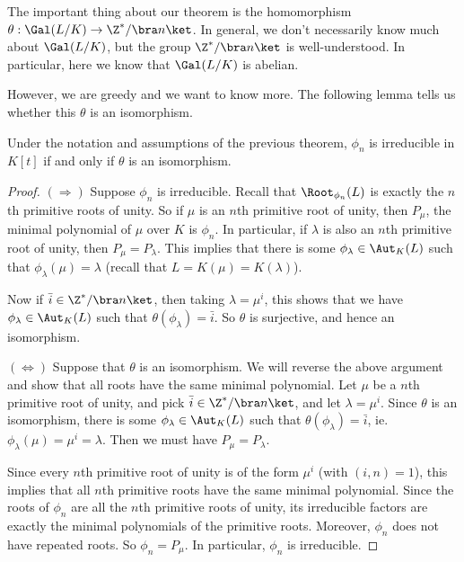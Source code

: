 \documentclass[a4paper]{article}
\begin{document}
The important thing about our theorem is the homomorphism $\theta: \Gal(L/K) \to \Z^*/\bra n\ket$. In general, we don't necessarily know much about $\Gal(L/K)$, but the group $\Z^*/\bra n\ket$ is well-understood. In particular, here we know that $\Gal(L/K)$ is abelian.

However, we are greedy and we want to know more. The following lemma tells us whether this $\theta$ is an isomorphism.

\begin{lemma}
  Under the notation and assumptions of the previous theorem, $\phi_n$ is irreducible in $K[t]$ if and only if $\theta$ is an isomorphism.
\end{lemma}

\begin{proof}
  $(\Rightarrow)$ Suppose $\phi_n$ is irreducible. Recall that $\Root_{\phi_n}(L)$ is exactly the $n$th primitive roots of unity. So if $\mu$ is an $n$th primitive root of unity, then $P_\mu$, the minimal polynomial of $\mu$ over $K$ is $\phi_n$. In particular, if $\lambda$ is also an $n$th primitive root of unity, then $P_\mu = P_\lambda$. This implies that there is some $\phi_\lambda \in \Aut_{K}(L)$ such that $\phi_\lambda(\mu) = \lambda$ (recall that $L = K(\mu) = K(\lambda)$).

  Now if $\bar{i} \in \Z^*/\bra n\ket$, then taking $\lambda = \mu^i$, this shows that we have $\phi_\lambda \in \Aut_K(L)$ such that $\theta(\phi_\lambda) = \bar{i}$. So $\theta$ is surjective, and hence an isomorphism.

  $(\Leftrightarrow)$ Suppose that $\theta$ is an isomorphism. We will reverse the above argument and show that all roots have the same minimal polynomial. Let $\mu$ be a $n$th primitive root of unity, and pick $\bar{i} \in \Z^*/\bra n\ket$, and let $\lambda = \mu^i$. Since $\theta$ is an isomorphism, there is some $\phi_\lambda \in \Aut_K(L)$ such that $\theta(\phi_\lambda) = \bar{i}$, ie. $\phi_\lambda(\mu) = \mu^i = \lambda$. Then we must have $P_\mu = P_\lambda$.

  Since every $n$th primitive root of unity is of the form $\mu^i$ (with $(i, n) = 1$), this implies that all $n$th primitive roots have the same minimal polynomial. Since the roots of $\phi_n$ are all the $n$th primitive roots of unity, its irreducible factors are exactly the minimal polynomials of the primitive roots. Moreover, $\phi_n$ does not have repeated roots. So $\phi_n = P_\mu$. In particular, $\phi_n$ is irreducible.
\end{proof}
\end{document}
